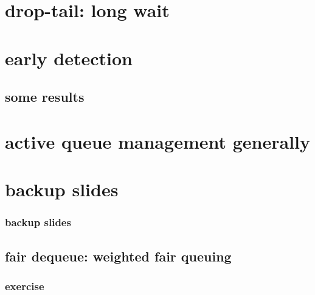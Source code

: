 \section{drop-tail: long wait}


\section{early detection}


\subsection{some results}


\section{active queue management generally}




\section{backup slides}
\begin{frame}\frametitle{backup slides}
\end{frame}

\subsection{fair dequeue: weighted fair queuing}



\subsubsection{exercise}




%


